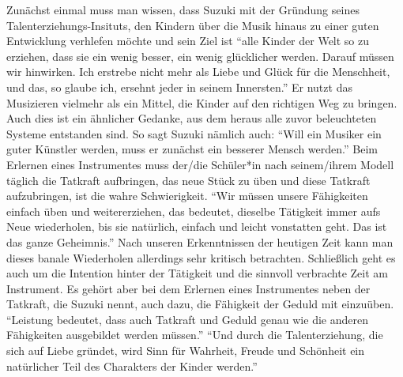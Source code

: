 Zunächst einmal muss man wissen, dass Suzuki mit der Gründung seines
Talenterziehungs-Insituts, den Kindern über die Musik hinaus zu einer guten
Entwicklung verhlefen möchte und sein Ziel ist \enquote{alle Kinder der Welt so
zu erziehen, dass sie ein wenig besser, ein wenig glücklicher werden. Darauf
müssen wir hinwirken. Ich erstrebe nicht mehr als Liebe und Glück für die
Menschheit, und das, so glaube ich, ersehnt jeder in seinem Innersten.}
\autocite[103]{suzuki:erziehung_ist_liebe}
Er nutzt das Musizieren vielmehr als ein Mittel, die Kinder auf den richtigen
Weg zu bringen. Auch dies ist ein ähnlicher Gedanke, aus dem heraus alle zuvor
beleuchteten Systeme entstanden sind. So sagt Suzuki nämlich auch: \enquote{Will
ein Musiker ein guter Künstler werden, muss er zunächst ein besserer Mensch
werden.}\autocite[103]{suzuki:erziehung_ist_liebe} Beim Erlernen eines
Instrumentes muss der/die Schüler*in nach seinem/ihrem Modell täglich die
Tatkraft aufbringen, das neue Stück zu üben und diese Tatkraft aufzubringen, ist
die wahre Schwierigkeit. \enquote{Wir müssen unsere Fähigkeiten einfach üben und
weitererziehen, das bedeutet, dieselbe Tätigkeit immer aufs Neue wiederholen,
bis sie natürlich, einfach und leicht vonstatten geht. Das ist das ganze
Geheimnis.}\autocite[57]{suzuki:erziehung_ist_liebe} Nach unseren Erkenntnissen
der heutigen Zeit kann man dieses banale Wiederholen allerdings sehr kritisch
betrachten. Schließlich geht es auch um die Intention hinter der Tätigkeit und
die sinnvoll verbrachte Zeit am Instrument. Es gehört aber bei dem Erlernen
eines Instrumentes neben der Tatkraft, die Suzuki nennt, auch dazu, die
Fähigkeit der Geduld mit einzuüben. \enquote{Leistung bedeutet, dass auch
Tatkraft und Geduld genau wie die anderen Fähigkeiten ausgebildet werden
müssen.}
\autocite[60]{suzuki:erziehung_ist_liebe}
\enquote{Und durch die Talenterziehung, die sich auf Liebe gründet, wird Sinn
für Wahrheit, Freude und Schönheit ein natürlicher Teil des Charakters der
Kinder werden.} \autocite[75]{suzuki:erziehung_ist_liebe}

